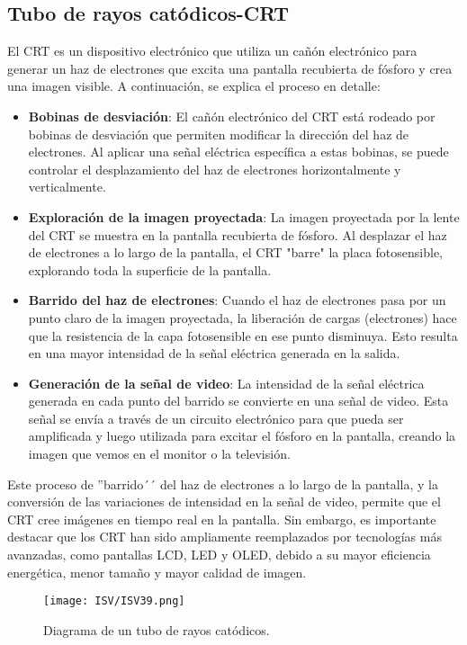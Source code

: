 \documentclass[
	12pt, %
	fleqn, %
	a4paper, %
	oneside, %
]{LegrandOrangeBook}
\begin{document}
\subsection{Tubo de rayos catódicos-CRT}
El CRT es un dispositivo electrónico que utiliza un cañón electrónico para generar un haz de electrones que excita una pantalla recubierta de fósforo y crea una imagen visible. A continuación, se explica el proceso en detalle:
\begin{itemize}
\item \textbf{Bobinas de desviación}: El cañón electrónico del CRT está rodeado por bobinas de desviación que permiten modificar la dirección del haz de electrones. Al aplicar una señal eléctrica específica a estas bobinas, se puede controlar el desplazamiento del haz de electrones horizontalmente y verticalmente.

\item \textbf{Exploración de la imagen proyectada}: La imagen proyectada por la lente del CRT se muestra en la pantalla recubierta de fósforo. Al desplazar el haz de electrones a lo largo de la pantalla, el CRT "barre" la placa fotosensible, explorando toda la superficie de la pantalla.

\item \textbf{Barrido del haz de electrones}: Cuando el haz de electrones pasa por un punto claro de la imagen proyectada, la liberación de cargas (electrones) hace que la resistencia de la capa fotosensible en ese punto disminuya. Esto resulta en una mayor intensidad de la señal eléctrica generada en la salida.

\item \textbf{Generación de la señal de video}: La intensidad de la señal eléctrica generada en cada punto del barrido se convierte en una señal de video. Esta señal se envía a través de un circuito electrónico para que pueda ser amplificada y luego utilizada para excitar el fósforo en la pantalla, creando la imagen que vemos en el monitor o la televisión.
\end{itemize}

Este proceso de ''barrido´´ del haz de electrones a lo largo de la pantalla, y la conversión de las variaciones de intensidad en la señal de video, permite que el CRT cree imágenes en tiempo real en la pantalla. Sin embargo, es importante destacar que los CRT han sido ampliamente reemplazados por tecnologías más avanzadas, como pantallas LCD, LED y OLED, debido a su mayor eficiencia energética, menor tamaño y mayor calidad de imagen.
\begin{figure}[H]
\centering
\texttt{[image: ISV/ISV39.png]}
\caption{Diagrama de un tubo de rayos catódicos.}
\end{figure}
\end{document}
